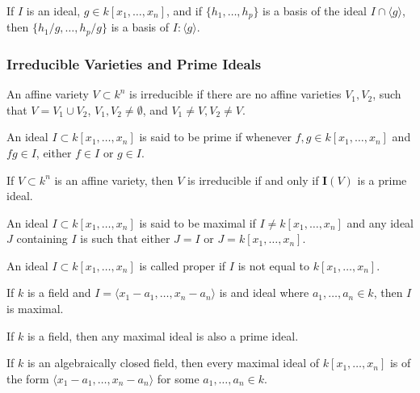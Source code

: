 \documentclass[../main.tex]{subfiles}
\begin{document}
\begin{theorem}
If $I$ is an ideal, $g\in k[x_1,\hdots ,x_n]$, and if $\{h_1,\hdots, h_p\}$ is a basis of the ideal $I\cap \langle g \rangle$, then $\{h_1/g,\hdots, h_p/g\}$ is a basis of $I:\langle g\rangle$.
\end{theorem}
%
\subsubsection{Irreducible Varieties and Prime Ideals}
%
\begin{definition}
An affine variety $V\subset k^n$ is irreducible if there are no affine varieties $V_1, V_2$, such that $V = V_1\cup V_2$, $V_1,V_2\ne \emptyset$, and $V_1 \ne V, V_2 \ne V$.
\end{definition}

\begin{definition}
An ideal $I\subset k[x_1,\hdots ,x_n]$ is said to be prime if whenever $f,g\in k[x_1,\hdots ,x_n]$ and $fg\in I$, either $f\in I$ or $g\in I$.
\end{definition}

\begin{theorem}
If $V\subset k^n$ is an affine variety, then $V$ is irreducible if and only if $\textbf{I}(V)$ is a prime ideal.
\end{theorem}

\begin{definition}
An ideal $I\subset k[x_1,\hdots ,x_n]$ is said to be maximal if $I \ne k[x_1,\hdots ,x_n]$ and any ideal $J$ containing $I$ is such that either $J = I$ or $J = k[x_1,\hdots ,x_n]$.
\end{definition}

\begin{definition}
An ideal $I\subset k[x_1,\hdots ,x_n]$ is called proper if $I$ is not equal to $k[x_1,\hdots ,x_n]$.
\end{definition}

\begin{theorem}
If $k$ is a field and $I = \langle x_1-a_1,\hdots, x_n-a_n\rangle$ is and ideal where $a_1,\hdots, a_n \in k$, then $I$ is maximal.
\end{theorem}

\begin{theorem}
If $k$ is a field, then any maximal ideal is also a prime ideal.
\end{theorem}

\begin{theorem}
If $k$ is an algebraically closed field, then every maximal ideal of $k[x_1,\hdots ,x_n]$ is of the form $\langle x_1-a_1,\hdots, x_n-a_n\rangle$ for some $a_1,\hdots, a_n\in k$.
\end{theorem}
\end{document}
